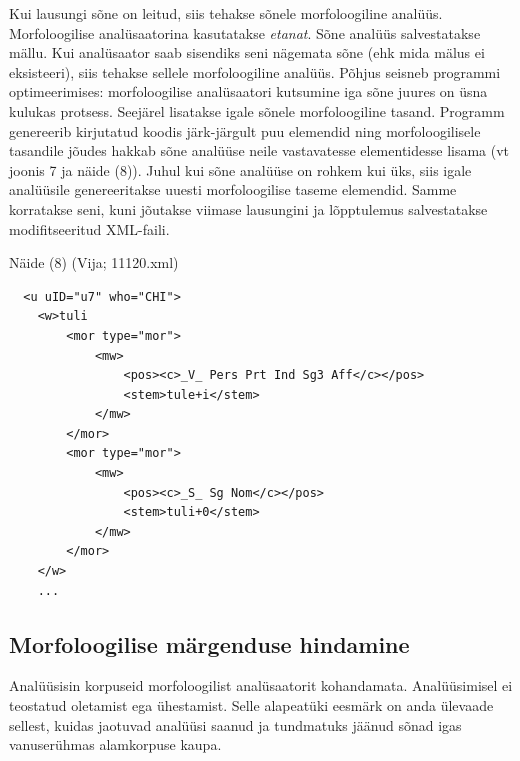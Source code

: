 \documentclass[12pt]{article}
\begin{document}
Kui lausungi sõne on leitud, siis tehakse sõnele morfoloogiline analüüs. Morfoloogilise analüsaatorina kasutatakse \emph{etanat}. Sõne analüüs salvestatakse mällu. Kui analüsaator saab sisendiks seni nägemata sõne (ehk mida mälus ei eksisteeri), siis tehakse sellele morfoloogiline analüüs. Põhjus seisneb programmi optimeerimises: morfoloogilise analüsaatori kutsumine iga sõne juures on üsna kulukas protsess. Seejärel lisatakse igale sõnele morfoloogiline tasand. Programm genereerib kirjutatud koodis järk-järgult puu elemendid ning morfoloogilisele tasandile jõudes hakkab sõne analüüse neile vastavatesse elementidesse lisama (vt joonis 7 ja näide (8)). Juhul kui sõne analüüse on rohkem kui üks, siis igale analüüsile genereeritakse uuesti morfoloogilise taseme elemendid. Samme korratakse seni, kuni jõutakse viimase lausungini ja lõpptulemus salvestatakse modifitseeritud XML-faili.

Näide (8) (Vija; 11120.xml)
\begin{lstlisting}
  <u uID="u7" who="CHI">
    <w>tuli
        <mor type="mor">
            <mw>
                <pos><c>_V_ Pers Prt Ind Sg3 Aff</c></pos>
                <stem>tule+i</stem>
            </mw>
        </mor>
        <mor type="mor">
            <mw>
                <pos><c>_S_ Sg Nom</c></pos>
                <stem>tuli+0</stem>
            </mw>
        </mor>
    </w>
    ...
\end{lstlisting}

\subsection{Morfoloogilise märgenduse hindamine}

Analüüsisin korpuseid morfoloogilist analüsaatorit kohandamata. Analüüsimisel ei teostatud oletamist ega ühestamist. Selle alapeatüki eesmärk on anda ülevaade sellest, kuidas jaotuvad analüüsi saanud ja tundmatuks jäänud sõnad igas vanuserühmas alamkorpuse kaupa.
\end{document}
